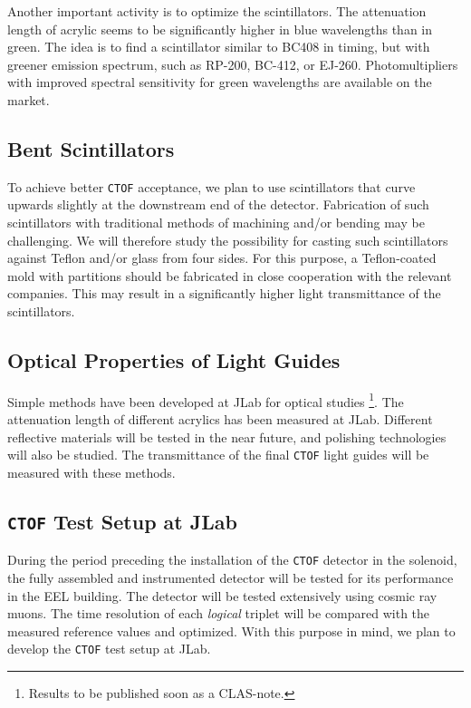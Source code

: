 \documentclass[12pt]{article}
\begin{document}
Another important activity is to optimize the scintillators.  The attenuation 
length of acrylic seems to be significantly higher in blue wavelengths than
in green.  The idea is to find a scintillator similar to BC408 in timing,
but with greener emission spectrum, such as RP-200, BC-412, or EJ-260.
Photomultipliers with improved spectral sensitivity for green wavelengths
are available on the market.  

\subsection{Bent Scintillators}

To achieve better {\tt CTOF} acceptance, we plan to use scintillators 
that curve upwards slightly at the downstream end of the detector.  
Fabrication of such scintillators with traditional methods of machining 
and/or bending may be challenging.  We will therefore study the possibility 
for casting such scintillators against Teflon and/or glass from four sides.
For this purpose, a Teflon-coated mold with partitions should be fabricated  
in close cooperation with the relevant companies.  This may result in a 
significantly higher light transmittance of the scintillators.

\subsection{Optical Properties of Light Guides}
 
Simple methods have been developed at JLab for optical studies
\footnote{Results to be published soon as a CLAS-note.}. The attenuation 
length of different acrylics has been measured at JLab.  Different reflective 
materials will be tested in the near future, and polishing technologies 
will also be studied.  The transmittance of the final {\tt CTOF} light 
guides will be measured with these methods.

\subsection{{\tt CTOF} Test Setup at JLab}
 
During the period preceding the installation of the {\tt CTOF} detector in
the solenoid, the fully assembled and instrumented detector will be tested 
for its performance in the EEL building.  The detector will be tested
extensively using cosmic ray muons.  The time resolution of each {\em logical}
triplet will be compared with the measured reference values and optimized.  
With this purpose in mind, we plan to develop the {\tt CTOF} test setup at 
JLab. 
\end{document}
